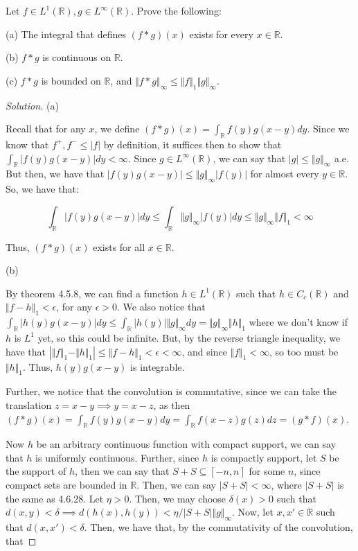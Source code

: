 \documentclass[10pt]{article}
\newenvironment{problem}[2][Problem]{\begin{trivlist}
\item[\hskip \labelsep {\bfseries #1}\hskip \labelsep {\bfseries #2.}]}{\end{trivlist}}
\begin{document}
\begin{problem}{4.6.27}

Let $f \in L^1(\mathbb{R}), g \in L^\infty(\mathbb{R})$. Prove the following:

(a) The integral that defines $(f \ast g)(x)$ exists for every $x \in \mathbb{R}$.

(b) $f \ast g$ is continuous on $\mathbb{R}$.

(c) $f \ast g$ is bounded on $\mathbb{R}$, and $\Vert f \ast g \Vert_\infty \leq \Vert f \Vert_1 \Vert g \Vert_\infty$.

\end{problem}
\begin{proof}[Solution]

(a)

Recall that for any $x$, we define $(f \ast g)(x) = \int_{\mathbb{R}} f(y)g(x-y) dy$. Since we know that $f^+, f^- \leq |f|$ by definition, it suffices then to show that $\int_{\mathbb{R}} |f(y)g(x-y)| dy < \infty$. Since $g \in L^\infty(\mathbb{R})$, we can say that $|g| \leq \Vert g \Vert_\infty$  a.e.  But then, we have that $|f(y)g(x-y)| \leq \Vert g \Vert_\infty|f(y)|$ for almost every $y \in \mathbb{R}$. So, we have that:

$$ \int_{\mathbb{R}} |f(y)g(x-y)| dy \leq \int_{\mathbb{R}} \Vert g \Vert_\infty|f(y)| dy \leq \Vert g \Vert_\infty \Vert f \Vert_1 < \infty$$

Thus, $(f \ast g)(x)$ exists for all $x \in \mathbb{R}$.

(b)

By theorem 4.5.8, we can find a function $h \in L^1(\mathbb{R})$ such that $h \in C_c(\mathbb{R})$ and $\Vert f - h \Vert_1 < \epsilon$, for any $\epsilon > 0$. We also notice that $\int_\mathbb{R} |h(y)g(x-y)| dy \leq \int_\mathbb{R} |h(y)| \Vert g \Vert_\infty dy  = \Vert g \Vert_\infty \Vert h \Vert_1$ where we don't know if $h$ is $L^1$ yet, so this could be infinite. But, by the reverse triangle inequality, we have that $| \Vert f \Vert_1 - \Vert h \Vert_1 | \leq \Vert f - h \Vert_1 < \epsilon < \infty$, and since $\Vert f \Vert_1 < \infty$, so too must be $\Vert h \Vert_1$. Thus, $h(y)g(x-y)$ is integrable.

Further, we notice that the convolution is commutative, since we can take the translation $z = x-y \implies y = x - z$, as then $(f \ast g)(x) = \int_\mathbb{R} f(y) g(x-y) dy = \int_\mathbb{R} f(x-z)g(z) dz = (g \ast f)(x)$. 

Now $h$ be an arbitrary continuous function with compact support, we can say that $h$ is uniformly continuous. Further, since $h$ is compactly support, let $S$ be the support of $h$, then we can say that $S+S \subseteq [-n,n]$ for some $n$, since compact sets are bounded in $\mathbb{R}$. Then, we can say $|S+S| < \infty$, where $|S+S|$ is the same as 4.6.28. Let $\eta > 0$. Then, we may choose $\delta(x) > 0$ such that $d(x,y) < \delta \implies d(h(x),h(y)) < \eta/|S+S|\Vert g \Vert_\infty$. Now, let $x,x' \in \mathbb{R}$ such that $d(x,x') < \delta$. Then, we have that, by the commutativity of the convolution, that


\end{proof}
\end{document}
